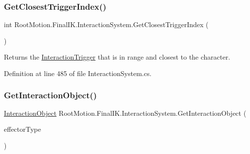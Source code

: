 \mbox{\label{class_root_motion_1_1_final_i_k_1_1_interaction_system_a81d9ef8e0ca4a4348eae92acc5269983}} 
\subsubsection{\texorpdfstring{Get\+Closest\+Trigger\+Index()}{GetClosestTriggerIndex()}}
{\footnotesize\ttfamily int Root\+Motion.\+Final\+I\+K.\+Interaction\+System.\+Get\+Closest\+Trigger\+Index (\begin{DoxyParamCaption}{ }\end{DoxyParamCaption})}



Returns the \mbox{\hyperlink{class_root_motion_1_1_final_i_k_1_1_interaction_trigger}{Interaction\+Trigger}} that is in range and closest to the character. 



Definition at line 485 of file Interaction\+System.\+cs.

\mbox{\label{class_root_motion_1_1_final_i_k_1_1_interaction_system_ad74b465115fe9bb8ee688ff02acf89cb}} 
\subsubsection{\texorpdfstring{Get\+Interaction\+Object()}{GetInteractionObject()}}
{\footnotesize\ttfamily \mbox{\hyperlink{class_root_motion_1_1_final_i_k_1_1_interaction_object}{Interaction\+Object}} Root\+Motion.\+Final\+I\+K.\+Interaction\+System.\+Get\+Interaction\+Object (\begin{DoxyParamCaption}\item[{\mbox{\hyperlink{namespace_root_motion_1_1_final_i_k_ae0dd2058c7667b6f132c11a6b860c14a}{Full\+Body\+Biped\+Effector}}}]{effector\+Type }\end{DoxyParamCaption})}



